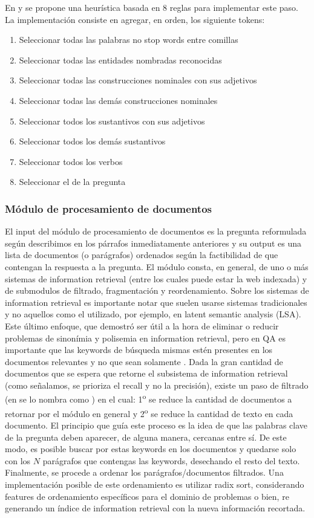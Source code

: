 En \cite{QA1} y \cite{QA3} se propone una heurística basada en 8 reglas para implementar este paso. La implementación consiste en agregar, en orden, los siguiente tokens:

\begin{enumerate}
\item Seleccionar todas las palabras no stop words entre comillas
\item Seleccionar todas las entidades nombradas reconocidas
\item Seleccionar todas las construcciones nominales con sus adjetivos
\item Seleccionar todas las demás construcciones nominales
\item Seleccionar todos los sustantivos con sus adjetivos
\item Seleccionar todos los demás sustantivos
\item Seleccionar todos los verbos
\item Seleccionar el  de la pregunta
\end{enumerate}

\subsubsection*{Módulo de procesamiento de documentos}
El input del módulo de procesamiento de documentos es la pregunta reformulada según describimos en los párrafos inmediatamente anteriores y su output es una lista de documentos (o parágrafos) ordenados según la factibilidad de que contengan la respuesta a la pregunta. El módulo consta, en general, de uno o más sistemas de information retrieval (entre los cuales puede estar la web indexada) y de submodulos de filtrado, fragmentación y reordenamiento. Sobre los sistemas de information retrieval es importante notar que suelen usarse sistemas tradicionales y no aquellos como el utilizado, por ejemplo, en latent semantic analysis (LSA). Este último enfoque, que demostró ser útil a la hora de eliminar o reducir problemas de sinonímia y polisemia en information retrieval, pero en QA es importante que las keywords de búsqueda mismas estén presentes en los documentos relevantes y no que sean solamente . Dada la gran cantidad de documentos que se espera que retorne el subsistema de information retrieval (como señalamos, se prioriza el recall y no la precisión), existe un paso de filtrado (en \cite{WATSON1} se lo nombra como ) en el cual: 1\textsuperscript{o} se reduce la cantidad de documentos a retornar por el módulo en general y 2\textsuperscript{o} se reduce la cantidad de texto en cada documento. El principio que guía este proceso es la idea de que las palabras clave de la pregunta deben aparecer, de alguna manera, cercanas entre sí. De este modo, es posible buscar por estas keywords en los documentos y quedarse solo con los $N$ parágrafos que contengas las keywords, desechando el resto del texto. Finalmente, se procede a ordenar los parágrafos/documentos filtrados. Una implementación posible de este ordenamiento es utilizar radix sort, considerando features de ordenamiento específicos para el dominio de problemas o bien, re generando un índice de information retrieval con la nueva información recortada.


